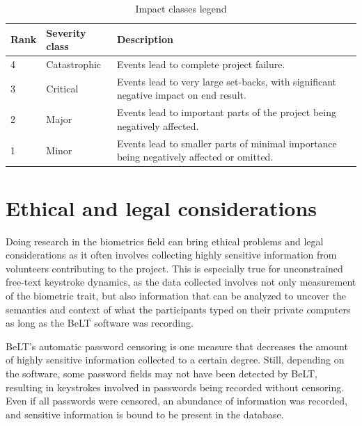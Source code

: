 \documentclass[informationsecurity]{gucmasterproject}
\begin{document}
\begin{table}[H]
\centering
\caption{Impact classes legend}
\label{tab:impact-classes}
\begin{tabular}{ p{2cm} p{3cm} p{8cm}}
\hline \bf Rank & \bf Severity class & \bf Description \\

\hline 4 & Catastrophic & Events lead to complete project failure. \\
3 & Critical & Events lead to very large set-backs, with significant negative impact on end result.\\
2 & Major & Events lead to important parts of the project being negatively affected. \\
1 & Minor & Events lead to smaller parts of minimal importance being negatively affected or omitted.\\
\hline
\end{tabular}
\end{table}





\chapter{Ethical and legal considerations}
Doing research in the biometrics field can bring ethical problems and legal considerations as it often involves collecting highly sensitive information from volunteers contributing to the project.
This is especially true for unconstrained free-text keystroke dynamics, as the data collected involves not only measurement of the biometric trait, but also information that can be analyzed to uncover the semantics and context of what the participants typed on their private computers as long as the BeLT software was recording.

BeLT's automatic password censoring is one measure that decreases the amount of highly sensitive information collected to a certain degree.
Still, depending on the software, some password fields may not have been detected by BeLT, resulting in keystrokes involved in passwords being recorded without censoring. 
Even if all passwords were censored, an abundance of information was recorded, and sensitive information is bound to be present in the database.
\end{document}

